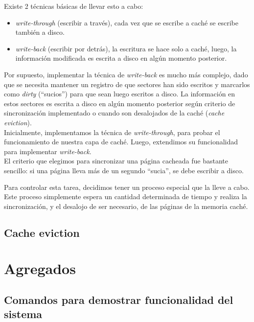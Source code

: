 \documentclass[a4paper,10pt]{article}
\begin{document}
        Existe 2 técnicas básicas de llevar esto a cabo:

        \begin{itemize}
        \item \textit{write-through} (escribir a través), cada vez que se escribe a caché se escribe también a disco.
        \item \textit{write-back} (escribir por detrás), la escritura se hace solo a caché, luego, la información modificada es escrita a disco en algún momento posterior.
        \end{itemize}

        Por supuesto, implementar la técnica de \textit{write-back} es mucho más complejo, dado que se necesita mantener un registro de que sectores han sido escritos y 
        marcarlos como \textit{dirty} (``sucios'') para que sean luego escritos a disco. La información en estos sectores es escrita a disco en algún momento posterior
        según criterio de sincronización implementado o cuando son desalojados de la caché (\textit{cache eviction}). \\

        Inicialmente, implementamos la técnica de \textit{write-through},  para probar el funcionamiento de nuestra capa de caché.
        Luego, extendimos su funcionalidad para implementar \textit{write-back}. \\

        El criterio que elegimos para sincronizar una página cacheada fue bastante sencillo: si una página lleva más de un segundo ``sucia'', se debe escribir a disco.
        
        Para controlar esta tarea, decidimos tener un proceso especial que la lleve a cabo. Este proceso simplemente espera un cantidad determinada de tiempo y realiza 
        la sincronización, y el desalojo de ser necesario, de las páginas de la memoria caché. 

        \subsection{Cache eviction}
        

\newpage
\section{Agregados}

        \subsection{Comandos para demostrar funcionalidad del sistema}
             
\end{document}
